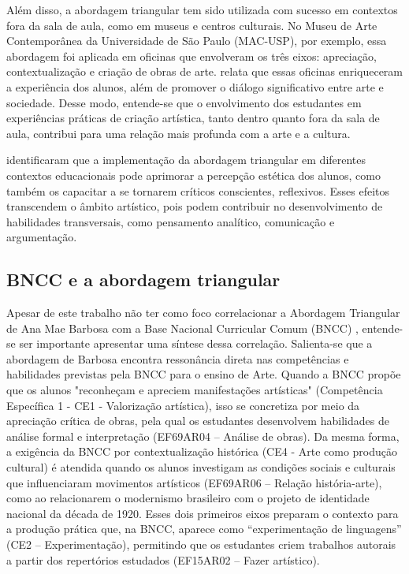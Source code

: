 \documentclass[portuguese]{textolivre}
\begin{document}
Além disso, a abordagem triangular tem sido utilizada com sucesso em contextos fora da sala de aula, como em museus e centros culturais. No Museu de Arte Contemporânea da Universidade de São Paulo (MAC-USP), por exemplo, essa abordagem foi aplicada em oficinas que envolveram os três eixos: apreciação, contextualização e criação de obras de arte. \textcite{barbosa2010arte} relata que essas oficinas enriqueceram a experiência dos alunos, além de promover o diálogo significativo entre arte e sociedade. Desse modo, entende-se que o envolvimento dos estudantes em experiências práticas de criação artística, tanto dentro quanto fora da sala de aula, contribui para uma relação mais profunda com a arte e a cultura.

\textcite{ferreira2015praticas} identificaram que a implementação da abordagem triangular em diferentes contextos educacionais pode aprimorar a percepção estética dos alunos, como também os capacitar a se tornarem críticos conscientes, reflexivos. Esses efeitos transcendem o âmbito artístico, pois podem contribuir no desenvolvimento de habilidades transversais, como pensamento analítico, comunicação e argumentação.

\subsection{BNCC e a abordagem triangular}
Apesar de este trabalho não ter como foco correlacionar a Abordagem Triangular de Ana Mae Barbosa com a Base Nacional Curricular Comum (BNCC) \cite{brasil2018bncc}, entende-se ser importante apresentar uma síntese dessa correlação. Salienta-se que a abordagem de Barbosa encontra ressonância direta nas competências e habilidades previstas pela BNCC para o ensino de Arte. Quando a BNCC propõe que os alunos "reconheçam e apreciem manifestações artísticas" (Competência Específica 1 - CE1 - Valorização artística), isso se concretiza por meio da apreciação crítica de obras, pela qual os estudantes desenvolvem habilidades de análise formal e interpretação (EF69AR04 – Análise de obras). Da mesma forma, a exigência da BNCC por contextualização histórica (CE4 - Arte como produção cultural) é atendida quando os alunos investigam as condições sociais e culturais que influenciaram movimentos artísticos (EF69AR06 – Relação história-arte), como ao relacionarem o modernismo brasileiro com o projeto de identidade nacional da década de 1920. Esses dois primeiros eixos preparam o contexto para a produção prática que, na BNCC, aparece como “experimentação de linguagens” (CE2 – Experimentação), permitindo que os estudantes criem trabalhos autorais a partir dos repertórios estudados (EF15AR02 – Fazer artístico).
\end{document}
